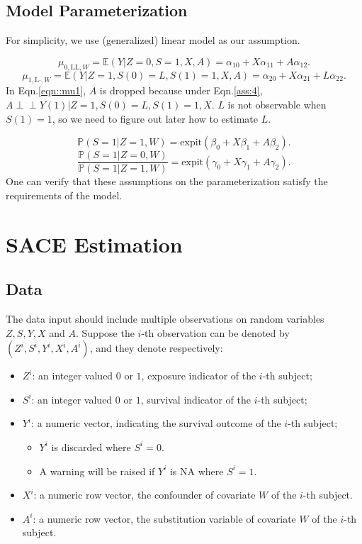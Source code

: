 \documentclass[article]{jss}
\def\ci{\perp\!\!\!\perp}
\def\expit{\mathrm{expit}}
\begin{document}
\subsection{Model Parameterization}\label{subsec:ModelParameterization}
For simplicity, we use (generalized) linear model as our assumption.

\begin{equation}
  \mu_{0,\text{LL},W} = \mathbb{E}(Y|Z=0,S=1,X,A) = \alpha_{10} + X\alpha_{11}+A\alpha_{12}.
\end{equation}
\begin{equation}
  \mu_{1,\text{L}\cdot,W} = \mathbb{E}(Y|Z=1,S(0)=L,S(1)=1,X,A) = \alpha_{20} + X\alpha_{21}+L\alpha_{22}.
  \label{eqn::mu1}
\end{equation}
In Eqn.\ref{eqn::mu1}, $A$ is dropped because under Eqn.\ref{ass:4}, $A\ci Y(1)|Z=1,S(0)=L,S(1)=1,X$. $L$ is not observable when $S(1)=1$, so we need to figure out later how to estimate $L$.

\begin{equation}
  \mathbb{P}(S=1|Z=1,W) = \expit(\beta_{0}+X\beta_{1}+A\beta_2).
\end{equation}
\begin{equation}
  \frac{\mathbb{P}(S=1|Z=0,W)}{\mathbb{P}(S=1|Z=1,W)} = \expit(\gamma_{0}+X\gamma_{1}+A\gamma_2).
\end{equation}
One can verify that these assumptions on the parameterization satisfy the requirements of the model.

\section{SACE Estimation} \label{sec:SACEEstimation}

\subsection{Data}

The data input should include multiple observations on random variables $Z,S,Y,X$ and $A$. Suppose the $i$-th observation can be denoted by $(Z^i,S^i,Y^i,X^i,A^i)$, and they denote respectively:
\begin{itemize}
  \item $Z^i$: an integer valued $0$ or $1$, exposure indicator of the $i$-th subject;
  \item $S^i$: an integer valued $0$ or $1$, survival indicator of the $i$-th subject;
  \item $Y^i$: a numeric vector, indicating the survival outcome of the $i$-th subject;
  \begin{itemize}
    \item $Y^i$ is discarded where $S^i=0$.
    \item A warning will be raised if $Y^i$ is NA where $S^i=1$.
  \end{itemize}
  \item $X^i$: a numeric row vector, the confounder of covariate $W$ of the $i$-th subject.
  \item $A^i$: a numeric row vector, the substitution variable of covariate $W$ of the $i$-th subject.
\end{itemize}
\end{document}
